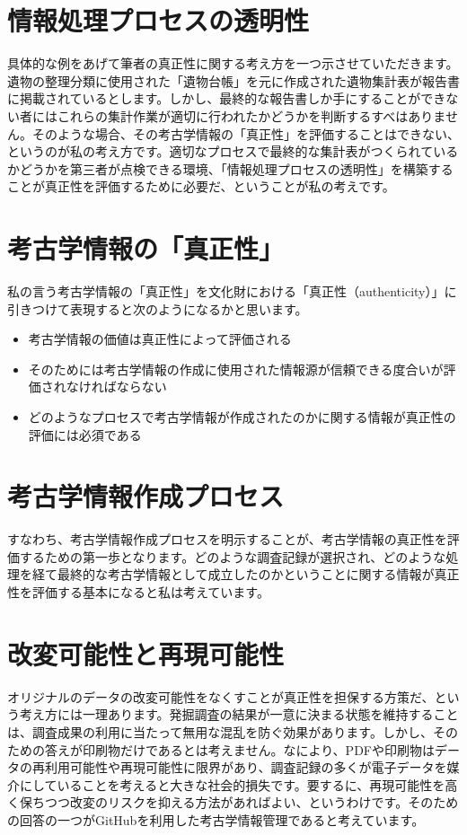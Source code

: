\documentclass[14Q]{jsarticle}
\begin{document}
\section{情報処理プロセスの透明性}
具体的な例をあげて筆者の真正性に関する考え方を一つ示させていただきます。遺物の整理分類に使用された「遺物台帳」を元に作成された遺物集計表が報告書に掲載されているとします。しかし、最終的な報告書しか手にすることができない者にはこれらの集計作業が適切に行われたかどうかを判断するすべはありません。そのような場合、その考古学情報の「真正性」を評価することはできない、というのが私の考え方です。適切なプロセスで最終的な集計表がつくられているかどうかを第三者が点検できる環境、「情報処理プロセスの透明性」を構築することが真正性を評価するために必要だ、ということが私の考えです。

\section{考古学情報の「真正性」}

私の言う考古学情報の「真正性」を文化財における「真正性（authenticity）」に引きつけて表現すると次のようになるかと思います。

\begin{itemize}
\item 考古学情報の価値は真正性によって評価される
\item そのためには考古学情報の作成に使用された情報源が信頼できる度合いが評価されなければならない
\item どのようなプロセスで考古学情報が作成されたのかに関する情報が真正性の評価には必須である
\end{itemize}

\section{考古学情報作成プロセス}
すなわち、考古学情報作成プロセスを明示することが、考古学情報の真正性を評価するための第一歩となります。どのような調査記録が選択され、どのような処理を経て最終的な考古学情報として成立したのかということに関する情報が真正性を評価する基本になると私は考えています。

\section{改変可能性と再現可能性}
オリジナルのデータの改変可能性をなくすことが真正性を担保する方策だ、という考え方には一理あります。発掘調査の結果が一意に決まる状態を維持することは、調査成果の利用に当たって無用な混乱を防ぐ効果があります。しかし、そのための答えが印刷物だけであるとは考えません。なにより、PDFや印刷物はデータの再利用可能性や再現可能性に限界があり、調査記録の多くが電子データを媒介にしていることを考えると大きな社会的損失です。要するに、再現可能性を高く保ちつつ改変のリスクを抑える方法があればよい、というわけです。そのための回答の一つがGitHubを利用した考古学情報管理であると考えています。
\end{document}
